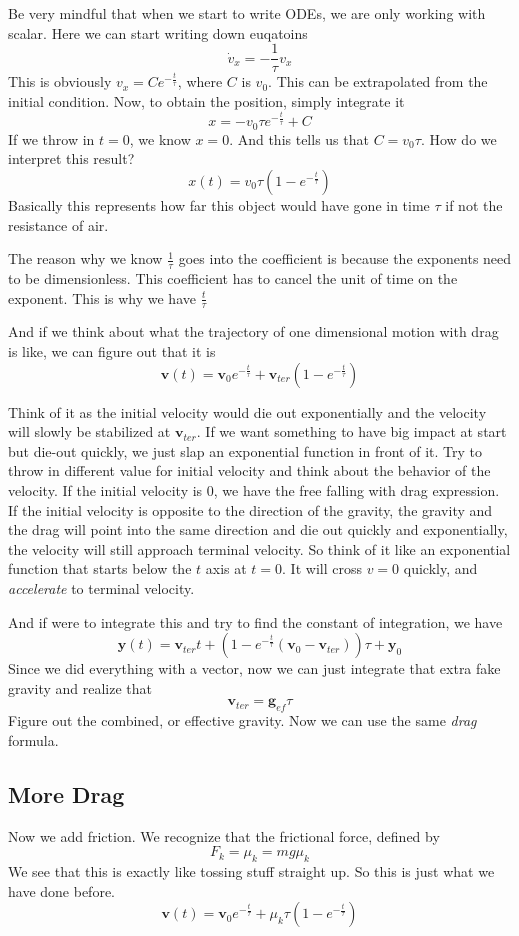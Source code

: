 \documentclass[12pt]{article}
\newcommand{\paren}[1]{\left( #1 \right)}
\begin{document}
Be very mindful that when we start to write ODEs, we are only working with scalar. Here we can start writing down euqatoins
\[
\dot{v}_x = -\frac{1}{\tau}v_x
\]
This is obviously $v_x = Ce^{-\frac{t}{\tau}}$, where $C$ is $v_0$. This can be extrapolated from the initial condition. Now, to obtain the position, simply integrate it
\[
x = -v_0\tau e^{-\frac{t}{\tau}} + C
\]
If we throw in $t=0$, we know $x=0$. And this tells us that $C = v_0\tau$. How do we interpret this result?
\[
x(t) = v_0\tau\paren{1 - e^{-\frac{t}{\tau}}}
\]
Basically this represents how far this object would have gone in time $\tau$ if not the resistance of air. 

The reason why we know $\frac{1}{\tau}$ goes into the coefficient is because the exponents need to be dimensionless. This coefficient has to cancel the unit of time on the exponent. This is why we have $\frac{t}{\tau}$

And if we think about what the trajectory of one dimensional motion with drag is like, we can figure out that it is
\[
\mathbf{v}(t) = \mathbf{v}_0 e^{-\frac{t}{\tau}} + \mathbf{v}_{ter}\paren{1-e^{-\frac{t}{\tau}}}
\]

Think of it as the initial velocity would die out exponentially and the velocity will slowly be stabilized at $\mathbf{v}_{ter}$. If we want something to have big impact at start but die-out quickly, we just slap an exponential function in front of it. Try to throw in different value for initial velocity and think about the behavior of the velocity. 
If the initial velocity is $0$, we have the free falling with drag expression.
If the initial velocity is opposite to the direction of the gravity, the gravity and the drag will point into the same direction and die out quickly and exponentially, the velocity will still approach terminal velocity. So think of it like an exponential function that starts below the $t$ axis at $t=0$. It will cross $v=0$ quickly, and \textit{accelerate} to terminal velocity.

And if were to integrate this and try to find the constant of integration, we have
\[
\mathbf{y}(t) = \mathbf{v}_{ter}t + \paren{1-e^{-\frac{t}{\tau}}\paren{\mathbf{v}_{0}-\mathbf{v}_{ter}}}\tau + \mathbf{y}_0
\]
Since we did everything with a vector, now we can just integrate that extra fake gravity and realize that
\[
\mathbf{v}_{ter} = \mathbf{g}_{ef}\tau
\]
Figure out the combined, or effective gravity. Now we can use the same \textit{drag} formula. 

\subsection{More Drag}
Now we add friction. We recognize that the frictional force, defined by
\[
F_k = \mu_k = mg\mu_k
\]
We see that this is exactly like tossing stuff straight up. So this is just what we have done before.
\[
\mathbf{v}(t) = \mathbf{v}_0e^{-\frac{t}{\tau}} + \mu_k\tau\paren{1-e^{-\frac{t}{\tau}}}
\]
\end{document}
